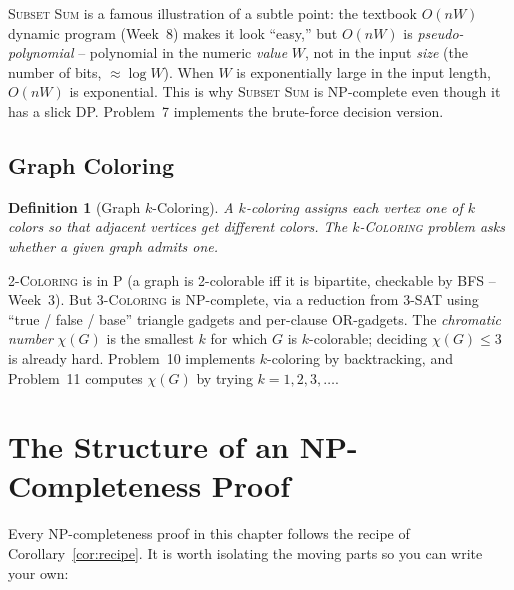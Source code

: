 \documentclass[11pt]{article}
\newtheorem{definition}[theorem]{Definition}
\begin{document}
\textsc{Subset Sum} is a famous illustration of a subtle point: the textbook
$O(nW)$ dynamic program (Week~8) makes it look ``easy,'' but $O(nW)$ is
\emph{pseudo-polynomial} -- polynomial in the numeric \emph{value} $W$, not in the input
\emph{size} (the number of bits, $\approx \log W$). When $W$ is exponentially large in the
input length, $O(nW)$ is exponential. This is why \textsc{Subset Sum} is NP-complete even
though it has a slick DP. Problem~7 implements the brute-force decision version.

\subsection{Graph Coloring}

\begin{definition}[Graph $k$-Coloring]
A \emph{$k$-coloring} assigns each vertex one of $k$ colors so that adjacent vertices get
different colors. The \textsc{$k$-Coloring} problem asks whether a given graph admits one.
\end{definition}

\textsc{2-Coloring} is in $\mathrm{P}$ (a graph is 2-colorable iff it is bipartite,
checkable by BFS -- Week~3). But \textsc{3-Coloring} is NP-complete, via a reduction from
\textsc{3-SAT} using ``true / false / base'' triangle gadgets and per-clause OR-gadgets.
The \emph{chromatic number} $\chi(G)$ is the smallest $k$ for which $G$ is $k$-colorable;
deciding $\chi(G) \le 3$ is already hard. Problem~10 implements $k$-coloring by
backtracking, and Problem~11 computes $\chi(G)$ by trying $k = 1, 2, 3, \ldots$.

\section{The Structure of an NP-Completeness Proof}

Every NP-completeness proof in this chapter follows the recipe of
Corollary~\ref{cor:recipe}. It is worth isolating the moving parts so you can write your
own:
\end{document}

